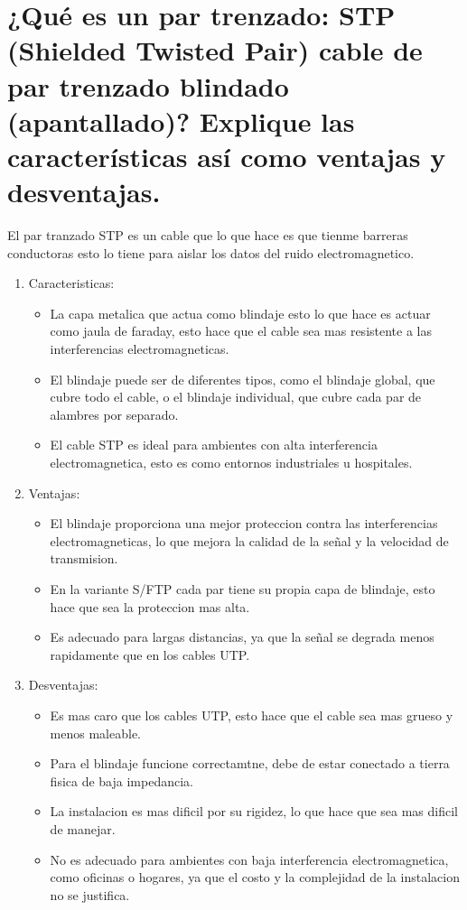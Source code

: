 \documentclass[a4paper,12pt]{article}
\begin{document}
\section{¿Qué es un par trenzado: STP (Shielded Twisted Pair) cable de par trenzado blindado (apantallado)? Explique las características así como ventajas y desventajas.}

El par tranzado STP es un cable que lo que hace es que tienme barreras conductoras esto lo tiene para aislar los datos del ruido electromagnetico.

\begin{enumerate}
    \item Caracteristicas:
    \begin{itemize}
        \item La capa metalica que actua como blindaje esto lo que hace es actuar como jaula de faraday, esto hace que el cable sea mas resistente a las interferencias electromagneticas.
        \item El blindaje puede ser de diferentes tipos, como el blindaje global, que cubre todo el cable, o el blindaje individual, que cubre cada par de alambres por separado.
        \item El cable STP es ideal para ambientes con alta interferencia electromagnetica, esto es como entornos industriales u hospitales.
    \end{itemize}
    \item Ventajas:
    \begin{itemize}
        \item El blindaje proporciona una mejor proteccion contra las interferencias electromagneticas, lo que mejora la calidad de la señal y la velocidad de transmision.
        \item En la variante S/FTP cada par tiene su propia capa de blindaje, esto hace que sea la proteccion mas alta.
        \item Es adecuado para largas distancias, ya que la señal se degrada menos rapidamente que en los cables UTP.
    \end{itemize}
    \item Desventajas:
    \begin{itemize}
        \item Es mas caro que los cables UTP, esto hace que el cable sea mas grueso y menos maleable.
        \item Para el blindaje funcione correctamtne, debe de estar conectado a tierra fisica de baja impedancia.
        \item La instalacion es mas dificil por su rigidez, lo que hace que sea mas dificil de manejar.
        \item No es adecuado para ambientes con baja interferencia electromagnetica, como oficinas o hogares, ya que el costo y la complejidad de la instalacion no se justifica.
    \end{itemize}
\end{enumerate}
\end{document}
